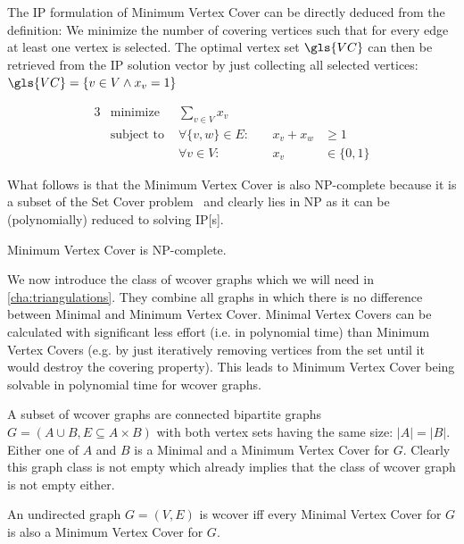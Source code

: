 The \gls{IP} formulation of Minimum Vertex Cover can be directly
deduced from the definition: We minimize the number of covering
vertices such that for every edge at least one vertex is selected. The
optimal vertex set \(\gls{VC}\) can then be retrieved from the
\gls{IP} solution vector by just collecting all selected vertices:
\( \gls{VC} = \{v \in V \land x_v = 1\} \)

\begin{problem}
  \begin{alignat*}{3}
    &\text{minimize } & \sum\limits_{v \in V} x_v \\
    &\text{subject to } & \forall \{v,w\} \in E : &~& x_v + x_w &\geq 1 \\
    && \forall v \in V : &~& x_v &\in \{0,1\}
  \end{alignat*}
\end{problem}

What follows is that the Minimum Vertex Cover is also NP-complete
because it is a subset of the Set Cover
problem~\cite{karp_np_complete} and clearly lies in NP as it can be
(polynomially) reduced to solving \gls{IP}[s].

\begin{theorem}
  \label{thm:minimum_vertex_cover_complexity}
  Minimum Vertex Cover is NP-complete.~\cite{karp_np_complete}
\end{theorem}

We now introduce the class of \gls{wcover} graphs which we will need
in \cref{cha:triangulations}. They combine all graphs in which there
is no difference between Minimal and Minimum Vertex Cover. Minimal
Vertex Covers can be calculated with significant less effort (i.e. 
in polynomial time) than Minimum Vertex Covers (e.g. by just
iteratively removing vertices from the set until it would destroy the
covering property). This leads to Minimum Vertex Cover being solvable
in polynomial time for \gls{wcover} graphs.

A subset of \gls{wcover} graphs are connected bipartite graphs
\(G=(A \cup B,E \subseteq A \times B)\) with both vertex sets having
the same size: \(|A|=|B|\). Either one of \(A\) and \(B\) is a Minimal
and a Minimum Vertex Cover for \(G\). Clearly this graph class is not
empty which already implies that the class of \gls{wcover} graph is
not empty either.

\begin{definition}
  \label{def:well_covered}
  An undirected graph \(G=(V,E)\) is \gls{wcover} iff every Minimal
  Vertex Cover for \(G\) is also a Minimum Vertex Cover for \(G\).
  \cite{graph_well_covered}
\end{definition}


